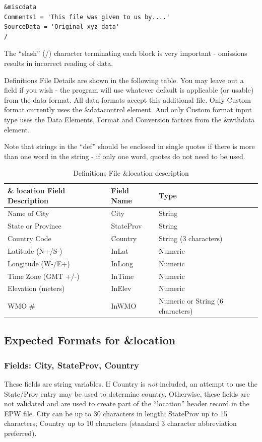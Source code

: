 \begin{lstlisting}
&miscdata
Comments1 = 'This file was given to us by....'
SourceData = 'Original xyz data'
/
\end{lstlisting}

The ``slash'' (/) character terminating each block is very important - omissions results in incorrect reading of data.

Definitions File Details are shown in the following table. You may leave out a field if you wish - the program will use whatever default is applicable (or usable) from the data format. All data formats accept this additional file. Only Custom format currently uses the \&datacontrol element. And only Custom format input type uses the Data Elements, Format and Conversion factors from the \&wthdata element.

Note that strings in the ``def'' should be enclosed in single quotes if there is more than one word in the string - if only one word, quotes do not need to be used.

\begin{longtable}[c]{p{2.12in}p{1.5in}p{2.37in}}
\caption{Definitions File \&location description \protect \label{table:definitions-file-location-description}}\\
\toprule 
\& location Field Description & Field Name & Type \tabularnewline \midrule
\endhead
Name of City & City & String \tabularnewline
State or Province & StateProv & String \tabularnewline
Country Code & Country & String (3 characters) \tabularnewline
Latitude (N+/S-) & InLat & Numeric \tabularnewline
Longitude (W-/E+) & InLong & Numeric \tabularnewline
Time Zone (GMT +/-) & InTime & Numeric \tabularnewline
Elevation (meters) & InElev & Numeric \tabularnewline
WMO \# & InWMO & Numeric or String (6 characters) \tabularnewline
\bottomrule
\end{longtable}

\subsection{Expected Formats for \&location}\label{expected-formats-for-location}

\subsubsection{Fields: City, StateProv, Country}\label{fields-city-stateprov-country}

These fields are string variables. If Country is \emph{not} included, an attempt to use the State/Prov entry may be used to determine country. Otherwise, these fields are not validated and are used to create part of the ``location'' header record in the EPW file. City can be up to 30 characters in length; StateProv up to 15 characters; Country up to 10 characters (standard 3 character abbreviation preferred).

